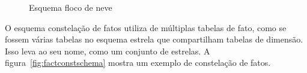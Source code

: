 \begin{figure}[!htb]
	\caption{Esquema floco de neve}\label{fig:snowflakeschema}
	\vspace{2mm}
	\begin{center}
	\end{center}
	\vspace{1mm}
	\legenda{}
\end{figure}

O esquema constelação de fatos utiliza de múltiplas tabelas de fato, como se fossem várias tabelas no esquema estrela que compartilham tabelas de dimensão.
Isso leva ao seu nome, como um conjunto de estrelas.
A figura~\ref{fig:factconstschema} mostra um exemplo de constelação de fatos.

